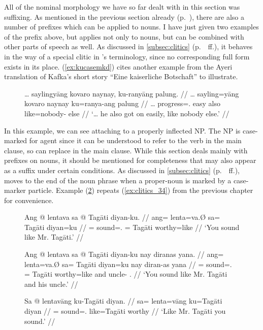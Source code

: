 All of the nominal morphology we have so far dealt with in this section was
suffixing. As mentioned in the previous section already
(p.~\pageref{nounprefixes}), there are also a number of prefixes which can be
applied to nouns. I have just given two examples of the prefix
 above, but  applies not only
to nouns, but can be combined with other parts of speech as well. As discussed
in \autoref{subsec:clitics} (p.~\pageref{clitics_prenoun_ku}~ff.), it behaves
in the way of a special clitic in \citet{zwicky1977}'s terminology, since no
corresponding full form exists in its place. (\ref{ex:kucasemkd}) cites another
example from the Ayeri translation of Kafka's short story \enquote{Eine
kaiserliche Botschaft} to illustrate.

\begin{figure}[h]
\ex\label{ex:kucasemkd}
\label{ex:kukafka2}\begingl
	\gla … saylingyāng kovaro naynay, ku-ranyāng palung. //
	\glb … sayling=yāng kovaro naynay ku=ranya-ang palung //
	\glc … progress=\TsgM{}.\Aarg{} easy also like=nobody-\Aarg{} else //
	\glft `… he also got on easily, like nobody else.'%
	//
\endgl\xe
\end{figure}

In this example, we can see  attaching to a properly inflected
NP. The NP  is case-marked for
agent since it can be understood to refer to the verb
 in the main clause, so  can replace  in the
main clause. While this section deals mainly with prefixes on nouns, it should
be mentioned for completeness that  may also appear as a suffix
under certain conditions. As discussed in \autoref{subsec:clitics}
(p.~\pageref{clitics_prenoun_ku}~ff.),  moves to the end of the
noun phrase when a proper-noun is marked by a case-marker particle. Example
(\ref{ex:kuposvar}) repeats (\ref{ex:clitics_34}) from the previous chapter for
convenience.

\begin{figure}[h]
\pex\label{ex:kuposvar}
\a\begingl
	\gla Ang @ lentava sa @ Tagāti diyan-ku. //
	\glb ang= lenta=va.Ø sa= Tagāti diyan=ku //
	\glc \AgtT{}= sound=\Second{}.\Top{} \Parg{}= Tagāti worthy=like //
	\glft `You sound like Mr. Tagāti.' //
\endgl

\a\begingl
	\gla Ang @ lentava sa @ Tagāti diyan-ku nay diranas yana. //
	\glb ang= lenta=va.Ø sa= Tagāti diyan=ku nay diran-as yana //
	\glc \AgtT{}= sound=\Second{}.\Top{} \Parg{}= Tagāti worthy=like and 
		uncle-\Parg{} \TsgM{}.\Gen{} //
	\glft `You sound like Mr. Tagāti and his uncle.' //
\endgl

\a\begingl
	\gla Sa @ lentavāng ku-​Tagāti diyan. //
	\glb sa= lenta=vāng ku=​Tagāti diyan //
	\glc \PatT{}= sound=\Second{}.\Aarg{} like=​Tagāti worthy //
	\glft `Like Mr. Tagāti you sound.' //
\endgl
\xe
\end{figure}

